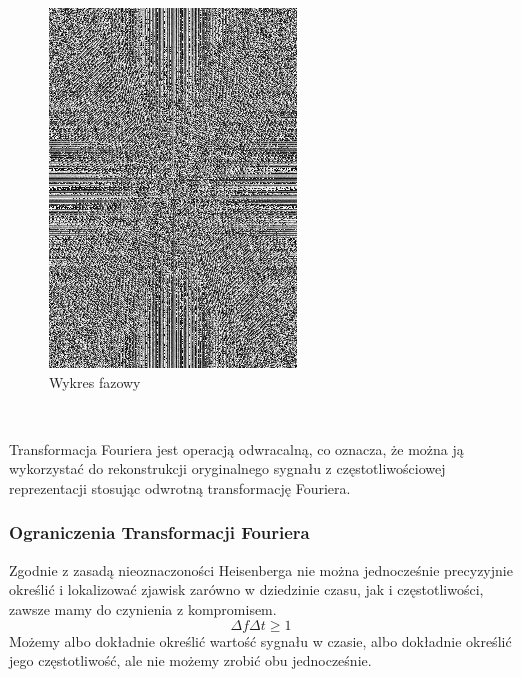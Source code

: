\begin{figure}[ht]
\begin{minipage}[t]{0.325\linewidth}
        \includegraphics[width=\linewidth]{Rozdziały/02.Podstawy_teoretyczne/Obrazy/fft_phase.png}
        \caption{Wykres fazowy}
        \label{fig:image26}
    \end{minipage}
\end{figure}\

Transformacja Fouriera jest operacją odwracalną, co oznacza, że można ją wykorzystać do rekonstrukcji oryginalnego sygnału z częstotliwościowej reprezentacji stosując odwrotną transformację Fouriera.


\subsubsection{Ograniczenia Transformacji Fouriera}

Zgodnie z zasadą nieoznaczoności Heisenberga nie można jednocześnie precyzyjnie określić i lokalizować zjawisk zarówno w dziedzinie czasu, jak i częstotliwości, zawsze mamy do czynienia z kompromisem. 
\begin{equation}
    \Delta f \Delta t \geq 1
\end{equation}
Możemy albo dokładnie określić wartość sygnału w czasie, albo dokładnie określić jego częstotliwość, ale nie możemy zrobić obu jednocześnie.


